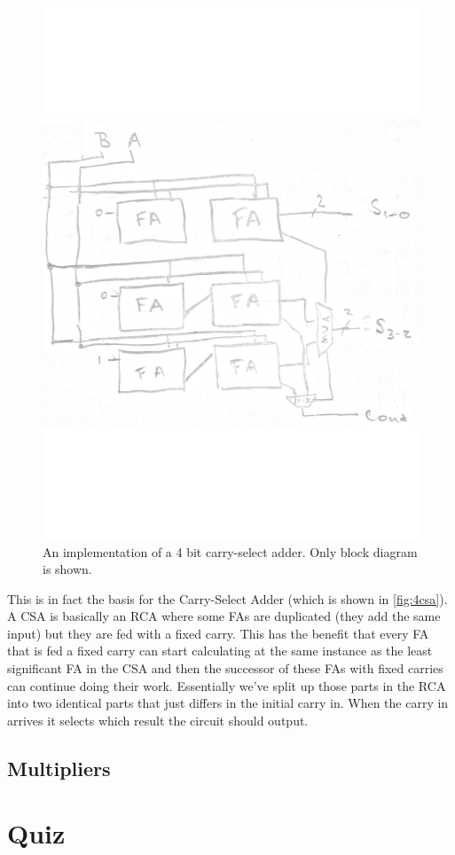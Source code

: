 \documentclass[a4paper,11pt]{report}
\begin{document}
\begin{figure}[H]
  \centering
  \includegraphics[width=.7\textwidth, trim={0 5cm 0 5cm}]{images/4b-CSA.pdf}
  \caption{An implementation of a 4 bit carry-select adder. Only block diagram is shown.}
  \label{fig:4csa}
\end{figure}

This is in fact the basis for the Carry-Select Adder (which is shown
in \autoref{fig:4csa}). A CSA is basically an RCA where some FAs are
duplicated (they add the same input) but they are fed with a fixed
carry. This has the benefit that every FA that is fed a fixed carry
can start calculating at the same instance as the least significant FA
in the CSA and then the successor of these FAs with fixed carries can
continue doing their work. Essentially we've split up those parts in
the RCA into two identical parts that just differs in the initial
carry in. When the carry in arrives it selects which result the
circuit should output.

\section{Multipliers}

\chapter{Quiz}
\end{document}
